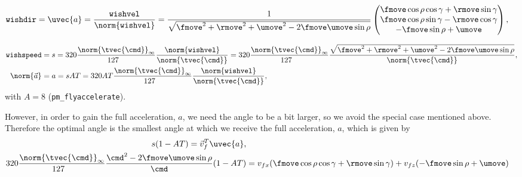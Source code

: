 \begin{align*}
\texttt{wishdir} &= \uvec{a} = \frac{\texttt{wishvel}}{\norm{\texttt{wishvel}}} = \frac{1}{\sqrt{\fmove^2 + \rmove^2 + \umove^2  - 2\fmove\umove\sin\rho}}
\begin{pmatrix}
\fmove \cos\rho\cos\gamma + \rmove \sin\gamma\\
\fmove \cos\rho\sin\gamma - \rmove \cos\gamma\\
-\fmove \sin\rho + \umove
\end{pmatrix},
\end{align*}

\begin{align*}
\texttt{wishspeed} &= s = 320\frac{\norm{\tvec{\cmd}}_{\infty}}{127\hphantom{_{\infty}}} \frac{\norm{\texttt{wishvel}}}{\norm{\tvec{\cmd}}} = 320\frac{\norm{\tvec{\cmd}}_{\infty}}{127\hphantom{_{\infty}}} \frac{\sqrt{\fmove^2 + \rmove^2 + \umove^2  - 2\fmove\umove\sin\rho}}{\norm{\tvec{\cmd}}},\\
\norm{\vec{a}} &= a = sAT = 320AT\frac{\norm{\tvec{\cmd}}_{\infty}}{127\hphantom{_{\infty}}} \frac{\norm{\texttt{wishvel}}}{\norm{\tvec{\cmd}}},
\end{align*}
with $A = 8$ (\texttt{pm\_flyaccelerate}).

However, in order to gain the full acceleration, $a$, we need the angle to be a bit larger, so we avoid the special case mentioned above. Therefore the optimal angle is the smallest angle at which we receive the full acceleration, $a$, which is given by
\begin{align*}
s(1-AT) = \vec{v}_f^T \uvec{a},\\
320\frac{\norm{\tvec{\cmd}}_{\infty}}{127\hphantom{_{\infty}}} \frac{\cmd^2  - 2\fmove\umove\sin\rho}{\cmd}(1-AT) &= v_{fx}(\fmove \cos\rho\cos\gamma + \rmove \sin\gamma) + v_{fz}(-\fmove \sin\rho + \umove)
\end{align*}

